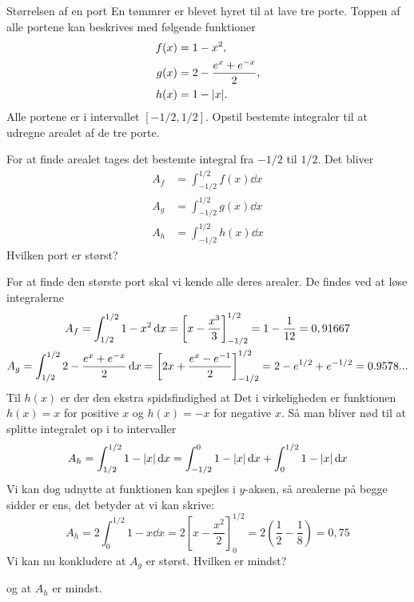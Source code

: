 \begin{opgave}[2]{Størrelsen af en port}
    En tømmrer er blevet hyret til at lave tre porte.
    Toppen af alle portene kan beskrives med følgende funktioner
    \begin{align*}
        f(x)&=1-x^2,\\
        g(x)&=2-\frac{e^x+e^{-x}}{2},\\
        h(x) &= 1-\abs{x}.
    \end{align*}
    Alle portene er i intervallet $[-1/2,1/2]$.
    \opg Opstil bestemte integraler til at udregne arealet af de tre porte.
    
    For at finde arealet tages det bestemte integral fra $-1/2$ til $1/2$. Det bliver
    \begin{align*}
        A_f&=\int_{-1/2}^{1/2}f(x)\dd{x}\\
        A_g&=\int_{-1/2}^{1/2}g(x)\dd{x}\\
        A_h&=\int_{-1/2}^{1/2}h(x)\dd{x}
    \end{align*}
    \opg Hvilken port er størst?
    
    For at finde den største port skal vi kende alle deres arealer. De findes ved at løse integralerne
    \begin{gather*}
        A_f=\int_{\-1/2}^{1/2}1-x^2\dd{x}=\left[x-\frac{x^3}{3}\right]_{-1/2}^{1/2}=1-\frac{1}{12}=0,91667\\
        A_g=\int_{\-1/2}^{1/2}2-\frac{e^x+e^{-x}}{2}\dd{x}=\left[2x+\frac{e^x-e^{-1}}{2}\right]_{-1/2}^{1/2}=2-e^{1/2}+e^{-1/2}=0.9578...
    \end{gather*}
    Til $h(x)$ er der den ekstra spidsfindighed at Det i virkeligheden er funktionen $h(x)=x$ for positive $x$ og $h(x)=-x$ for negative $x$.
    Så man bliver nød til at splitte integralet op i to intervaller
    $$
    A_h=\int_{\-1/2}^{1/2}1-\abs{x}\dd{x}=\int_{-1/2}^{0}1-\abs{x}\dd{x}+\int_{0}^{1/2}1-\abs{x}\dd{x}
    $$
    Vi kan dog udnytte at funktionen kan spejles i $y$-aksen, så arealerne på begge sidder er ens, det betyder at vi kan skrive:
    $$
    A_h=2\int_0^{1/2}1-x\dd{x}=2\left[x-\frac{x^2}{2}\right]_0^{1/2}=2(\frac{1}{2}-\frac{1}{8})=0,75
    $$
    Vi kan nu konkludere at $A_g$ er størst.
    \opg Hvilken er mindst?
    
    og at $A_h$ er mindst.
\end{opgave}
